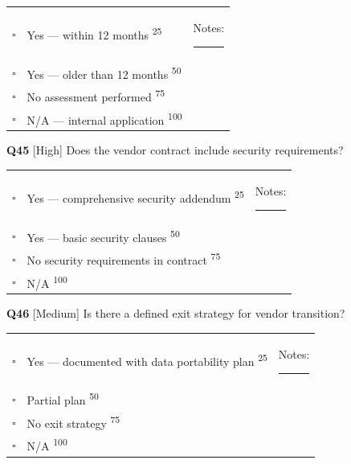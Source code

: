 \documentclass[11pt,landscape]{article}
\begin{document}
\begin{tabularx}{\textwidth}{cXX}
$\square$ & Yes --- within 12 months \textsuperscript{\scriptsize\textcolor{stridegray}{25}} & Notes: \rule{4cm}{0.4pt} \\
$\square$ & Yes --- older than 12 months \textsuperscript{\scriptsize\textcolor{stridegray}{50}} &  \\
$\square$ & No assessment performed \textsuperscript{\scriptsize\textcolor{stridegray}{75}} &  \\
$\square$ & N/A --- internal application \textsuperscript{\scriptsize\textcolor{stridegray}{100}} &  \\
\end{tabularx}

\vspace{0.3cm}

\noindent\colorbox{highbg}{\textbf{Q45} [High]} Does the vendor contract include security requirements?

\begin{tabularx}{\textwidth}{cXX}
$\square$ & Yes --- comprehensive security addendum \textsuperscript{\scriptsize\textcolor{stridegray}{25}} & Notes: \rule{4cm}{0.4pt} \\
$\square$ & Yes --- basic security clauses \textsuperscript{\scriptsize\textcolor{stridegray}{50}} &  \\
$\square$ & No security requirements in contract \textsuperscript{\scriptsize\textcolor{stridegray}{75}} &  \\
$\square$ & N/A \textsuperscript{\scriptsize\textcolor{stridegray}{100}} &  \\
\end{tabularx}

\vspace{0.3cm}

\noindent\colorbox{medbg}{\textbf{Q46} [Medium]} Is there a defined exit strategy for vendor transition?

\begin{tabularx}{\textwidth}{cXX}
$\square$ & Yes --- documented with data portability plan \textsuperscript{\scriptsize\textcolor{stridegray}{25}} & Notes: \rule{4cm}{0.4pt} \\
$\square$ & Partial plan \textsuperscript{\scriptsize\textcolor{stridegray}{50}} &  \\
$\square$ & No exit strategy \textsuperscript{\scriptsize\textcolor{stridegray}{75}} &  \\
$\square$ & N/A \textsuperscript{\scriptsize\textcolor{stridegray}{100}} &  \\
\end{tabularx}
\end{document}
